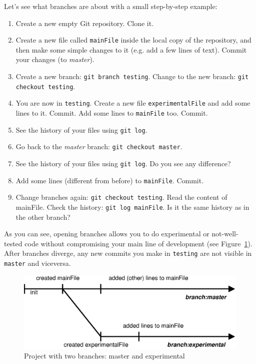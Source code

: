 Let's see what branches are about with a small step-by-step example: 

\begin{enumerate}
\item Create a new empty Git repository. Clone it.
\item Create a new file called \verb+mainFile+ inside 
  the local copy of the repository, and then make some
  simple changes to it (e.g. add a few lines of text). 
  Commit your changes (to \emph{master}). 
\item Create a new branch: \verb+git branch testing+. Change to the
  new branch: \verb+git checkout testing+.
\item You are now in \verb+testing+. Create a new file
  \verb+experimentalFile+ and add some lines to it. Commit. 
  Add some lines
  to \verb+mainFile+ too. Commit.
\item See the history of your files using \verb+git log+.
\item Go back to the \emph{master} branch: 
  \verb+git checkout master+. 
\item See the history of your files using \verb+git log+. Do you see
  any difference?
\item Add some lines (different from before) to
  \verb+mainFile+. Commit.
\item Change branches again: \verb+git checkout testing+. Read the
  content of mainFile. Check the history: \verb+git log mainFile+. Is
  it the same history as in the other branch?
\end{enumerate}

As you can see, opening branches allows you to do experimental or
not-well-tested code without compromising your main line of
development (see Figure~\ref{fig:git-example-3}). 
After branches diverge, any new commits you make in \verb+testing+ are not
visible in \verb+master+ and viceversa. 

\begin{figure}[htbp!]
  \centering
  \includegraphics[width=\textwidth]{gfx/commit_history_3.eps}
  \caption{Project with two branches: master and experimental}
  \label{fig:git-example-3}
\end{figure}

